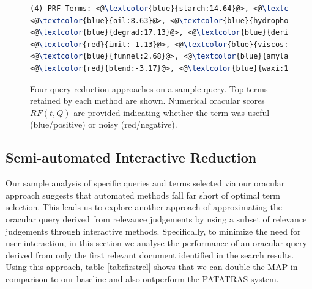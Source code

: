 \begin{figure}[htpb]
\begin{framed}
\begin{lstlisting}[basicstyle=\small\ttfamily , linewidth=\columnwidth,breaklines=true, language=TeX]
(4) PRF Terms: <@\textcolor{blue}{starch:14.64}@>, <@\textcolor{blue}{encapsul:17.50}@>, <@\textcolor{red}{chees:-4.22}@>, 
<@\textcolor{blue}{oil:8.63}@>, <@\textcolor{blue}{hydrophob:5.45}@>, <@\textcolor{blue}{agent:5.19}@>, <@\textcolor{red}{casein:-2.19}@>, 
<@\textcolor{blue}{degrad:17.13}@>, <@\textcolor{blue}{deriv:11.97}@>, <@\textcolor{blue}{tablet:5.30}@>, <@\textcolor{red}{debranch:-10.58}@>, 
<@\textcolor{red}{imit:-1.13}@>, <@\textcolor{blue}{viscos:7.77}@>, <@\textcolor{blue}{oxid:5.97}@>, <@\textcolor{blue}{activ:5.98}@>, <@\textcolor{blue}{osa:9.32}@>, 
<@\textcolor{blue}{funnel:2.68}@>, <@\textcolor{blue}{amylas:26.06}@>, <@\textcolor{red}{amylopectin:-7.14}@>, <@\textcolor{blue}{maiz:20.61}@>, 
<@\textcolor{red}{blend:-3.17}@>, <@\textcolor{blue}{waxi:19.41}@>, <@\textcolor{blue}{convert:31.81}@>, 

 \end{lstlisting} 
 \vspace*{-2ex}
\end{framed}
 \vspace*{-2ex}
  \caption{Four query reduction approaches on a sample query.  Top
    terms retained by each method are shown.  Numerical oracular
    scores $\mathit{RF}(t,Q)$ are provided indicating whether the term
    was useful (blue/positive) or noisy (red/negative).}
  \label{fig:anecdotal}  
\end{figure}
\FloatBarrier
\subsection{Semi-automated Interactive Reduction}
\label{sec:SemiAutomatedInteractiveReduction}
Our sample analysis of specific queries and terms selected via our oracular
approach suggests that automated methods fall far short of optimal term selection.
This leads us to explore another approach of approximating the oracular query
derived from relevance judgements by using a subset of relevance judgements
through interactive methods. Specifically, to minimize the need for user interaction,
in this section we analyse the performance of an oracular query derived from
only the first relevant document identified in the search results.
Using this approach, table \ref{tab:firstrel} shows that we can double the MAP in comparison to our baseline and also outperform the PATATRAS system.

